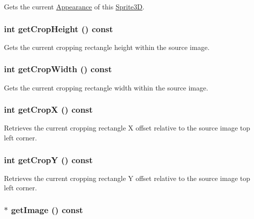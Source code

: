 Gets the current \hyperlink{classm3g_1_1Appearance}{Appearance} of this \hyperlink{classm3g_1_1Sprite3D}{Sprite3D}. \hypertarget{classm3g_1_1Sprite3D_d6d9d6f23b7bb004c93642bcd081f4a3}{
\subsubsection[{getCropHeight}]{\setlength{\rightskip}{0pt plus 5cm}int getCropHeight () const}}
\label{classm3g_1_1Sprite3D_d6d9d6f23b7bb004c93642bcd081f4a3}


Gets the current cropping rectangle height within the source image. \hypertarget{classm3g_1_1Sprite3D_5c6515f6706675ef31ca5dfa0a03b953}{
\subsubsection[{getCropWidth}]{\setlength{\rightskip}{0pt plus 5cm}int getCropWidth () const}}
\label{classm3g_1_1Sprite3D_5c6515f6706675ef31ca5dfa0a03b953}


Gets the current cropping rectangle width within the source image. \hypertarget{classm3g_1_1Sprite3D_d0ba0211183decc8f0459ca598b12912}{
\subsubsection[{getCropX}]{\setlength{\rightskip}{0pt plus 5cm}int getCropX () const}}
\label{classm3g_1_1Sprite3D_d0ba0211183decc8f0459ca598b12912}


Retrieves the current cropping rectangle X offset relative to the source image top left corner. \hypertarget{classm3g_1_1Sprite3D_9ef03b219415a1f08aef6745ad5d87d0}{
\subsubsection[{getCropY}]{\setlength{\rightskip}{0pt plus 5cm}int getCropY () const}}
\label{classm3g_1_1Sprite3D_9ef03b219415a1f08aef6745ad5d87d0}


Retrieves the current cropping rectangle Y offset relative to the source image top left corner. \hypertarget{classm3g_1_1Sprite3D_a8c0193b0e7d47d4b5c9f60df24c44f5}{
\subsubsection[{getImage}]{ $\ast$ getImage () const}}
\label{classm3g_1_1Sprite3D_a8c0193b0e7d47d4b5c9f60df24c44f5}


